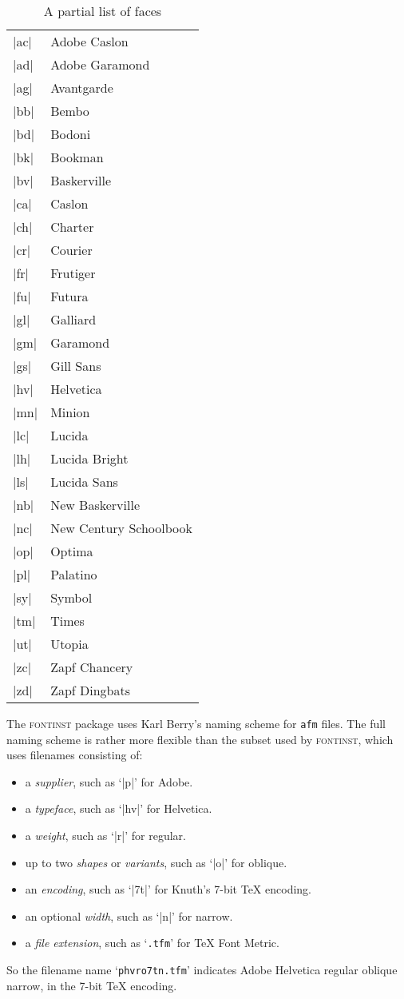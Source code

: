 \documentclass[a4paper]{ltxguide}
\newcommand*{\setfilename}[1]{\texttt{#1}}
\newcommand*{\setpackagename}[1]{\textsc{#1}}
\newcommand{\fontinst}{\setpackagename{font\-inst}\xspace}
\newcommand{\afm}{\setfilename{afm}\xspace}
\begin{document}
\begin{table}[!t]
\begin{minipage}{0.5\textwidth}
\begin{tabular}{ll}
    |ac| & Adobe Caslon \\
    |ad| & Adobe Garamond \\
    |ag| & Avantgarde \\
    |bb| & Bembo \\
    |bd| & Bodoni \\
    |bk| & Bookman \\
    |bv| & Baskerville \\
    |ca| & Caslon \\
    |ch| & Charter \\
    |cr| & Courier \\
    |fr| & Frutiger \\
    |fu| & Futura \\
    |gl| & Galliard \\
    |gm| & Garamond \\
    |gs| & Gill Sans \\
    |hv| & Helvetica \\
    |mn| & Minion \\
    |lc| & Lucida \\
    |lh| & Lucida Bright \\
    |ls| & Lucida Sans \\
    |nb| & New Baskerville \\
    |nc| & New Century Schoolbook \\
    |op| & Optima \\
    |pl| & Palatino \\
    |sy| & Symbol \\
    |tm| & Times \\
    |ut| & Utopia \\
    |zc| & Zapf Chancery \\
    |zd| & Zapf Dingbats \\
  \end{tabular}
  \caption{A partial list of faces}
  \label{Tab:typeface}
\end{minipage}
\end{table}

The \fontinst package uses Karl Berry's naming scheme for \afm
files.  The full naming scheme is rather more flexible than the
subset used by \fontinst, which uses filenames consisting of:
\begin{itemize}
\item a \emph{supplier}, such as `|p|' for Adobe.
\item a \emph{typeface}, such as `|hv|' for Helvetica.
\item a \emph{weight}, such as `|r|' for regular.
\item up to two \emph{shapes} or \emph{variants}, such as `|o|'
  for oblique.
\item an \emph{encoding}, such as `|7t|' for Knuth's 7-bit \TeX{}
  encoding.
\item an optional \emph{width}, such as `|n|' for narrow.
\item a \emph{file extension}, such as `\texttt{.tfm}'
  for \TeX{} Font Metric.
\end{itemize}
So the filename name `\texttt{phvro7tn.tfm}' indicates Adobe
Helvetica regular oblique narrow, in the 7-bit \TeX{} encoding.
\end{document}
